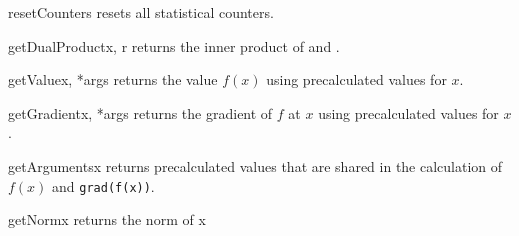 \begin{methoddesc}[CostFunction]{resetCounters}{}
    resets all statistical counters.
\end{methoddesc}
%
\begin{methoddesc}[CostFunction]{getDualProduct}{x, r}
    returns the inner product of  and .
\end{methoddesc}
%
\begin{methoddesc}[CostFunction]{getValue}{x, *args}
    returns the value $f(x)$ using precalculated values for $x$.
\end{methoddesc}
%
\begin{methoddesc}[CostFunction]{getGradient}{x, *args}
    returns the gradient of $f$ at $x$ using precalculated values for $x$.
\end{methoddesc}
%
\begin{methoddesc}[CostFunction]{getArguments}{x}
    returns precalculated values that are shared in the calculation of $f(x)$
    and \texttt{grad(f(x))}.
\end{methoddesc}
\begin{methoddesc}[CostFunction]{getNorm}{x}
returns the norm of x
\end{methoddesc}
